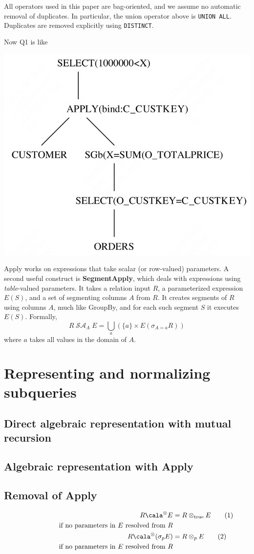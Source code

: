 \documentclass[11pt]{article}
\DeclareMathOperator{\SA}{\mathcal{SA}}
\begin{document}
All operators used in this paper are bag-oriented, and we assume no automatic removal of duplicates.
In particular, the union operator above is \texttt{UNION ALL}. Duplicates are removed explicitly using
\texttt{DISTINCT}.

Now Q1 is like
\begin{center}
\includegraphics[width=.5\textwidth]{../../images/papers/96.png}
\end{center}

Apply works on expressions that take scalar (or row-valued) parameters. A second useful construct is
\textbf{SegmentApply}, which deals with expressions using \emph{table}-valued parameters. It takes a relation input
\(R\), a parameterized expression \(E(S)\), and a set of segmenting columns \(A\) from \(R\). It
creates segments of \(R\) using columns \(A\), much like GroupBy, and for each such segment \(S\) it
executes \(E(S)\). Formally,
\begin{equation*}
R\SA_AE=\bigcup_{a}(\{a\}\times E(\sigma_{A=a}R))
\end{equation*}
where \(a\) takes all values in the domain of \(A\).
\section{Representing and normalizing subqueries}
\label{sec:org9c8abcb}
\subsection{Direct algebraic representation with mutual recursion}
\label{sec:org0327870}
\subsection{Algebraic representation with Apply}
\label{sec:orgf914b49}
\subsection{Removal of Apply}
\label{sec:orgc3bc9ed}
\begin{align*}
R\cala^{\otimes}E&=R\otimes_{\text{true}}E\tag{1}\\
\hspace{2cm}\text{if no parameters in \(E\) resolved from \(R\)}\\
R\cala^{\otimes}(\sigma_pE)&=R\otimes_pE\tag{2}\\
\text{if no parameters in \(E\) resolved from \(R\)}
\end{align*}
\end{document}
